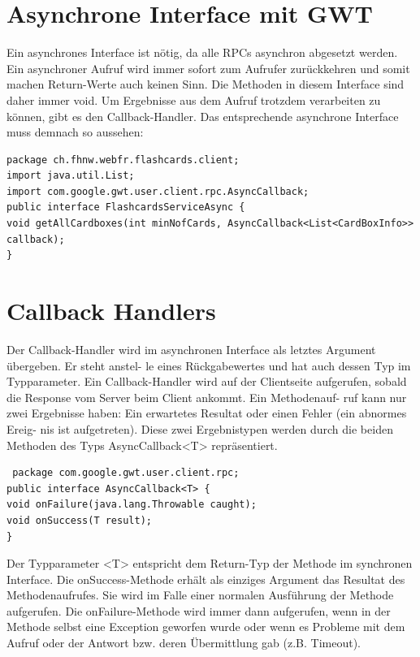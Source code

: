 \documentclass[a4paper,10pt]{scrreprt}
\begin{document}
\section{Asynchrone Interface mit GWT}
Ein asynchrones Interface ist nötig, da alle RPCs asynchron abgesetzt werden. Ein asynchroner Aufruf
wird immer sofort zum Aufrufer zurückkehren und somit machen Return-Werte auch keinen Sinn.
Die Methoden in diesem Interface sind daher immer void. Um Ergebnisse aus dem Aufruf trotzdem
verarbeiten zu können, gibt es den Callback-Handler.
Das entsprechende asynchrone Interface muss demnach so aussehen:
\begin{lstlisting}
package ch.fhnw.webfr.flashcards.client;
import java.util.List;
import com.google.gwt.user.client.rpc.AsyncCallback;
public interface FlashcardsServiceAsync {
void getAllCardboxes(int minNofCards, AsyncCallback<List<CardBoxInfo>> callback);
}
\end{lstlisting}

\section{Callback Handlers}
Der Callback-Handler wird im asynchronen Interface als letztes Argument übergeben. Er steht anstel-
le eines Rückgabewertes und hat auch dessen Typ im Typparameter. Ein Callback-Handler wird auf
der Clientseite aufgerufen, sobald die Response vom Server beim Client ankommt. Ein Methodenauf-
ruf kann nur zwei Ergebnisse haben: Ein erwartetes Resultat oder einen Fehler (ein abnormes Ereig-
nis ist aufgetreten). Diese zwei Ergebnistypen werden durch die beiden Methoden des Typs
AsyncCallback<T> repräsentiert.
\begin{lstlisting}
 package com.google.gwt.user.client.rpc;
public interface AsyncCallback<T> {
void onFailure(java.lang.Throwable caught);
void onSuccess(T result);
}
\end{lstlisting}

Der Typparameter <T> entspricht dem Return-Typ der Methode im synchronen Interface.
Die onSuccess-Methode erhält als einziges Argument das Resultat des Methodenaufrufes. Sie wird
im Falle einer normalen Ausführung der Methode aufgerufen.
Die onFailure-Methode wird immer dann aufgerufen, wenn in der Methode selbst eine Exception
geworfen wurde oder wenn es Probleme mit dem Aufruf oder der Antwort bzw. deren Übermittlung
gab (z.B. Timeout).
\end{document}
